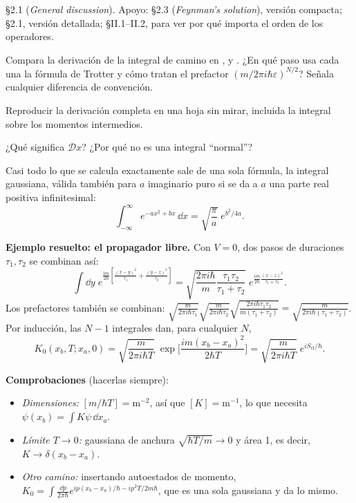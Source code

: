  \S2.1 (\textit{General discussion}). Apoyo:  \S2.3 (\textit{Feynman's solution}), versión compacta;  \S2.1, versión detallada;  \S II.1--II.2, para ver por qué importa el orden de los operadores.

\begin{prompt}
Compara la derivación de la integral de camino en ,  y . ¿En qué paso usa cada una la fórmula de Trotter y cómo tratan el prefactor $(m/2\pi i\hbar\varepsilon)^{N/2}$? Señala cualquier diferencia de convención.
\end{prompt}

Reproducir la derivación completa en una hoja sin mirar, incluida la integral sobre los momentos intermedios.

¿Qué significa $\mathcal Dx$? ¿Por qué no es una integral ``normal''?


Casi todo lo que se calcula exactamente sale de una sola fórmula, la integral gaussiana, válida también para $a$ imaginario puro si se da a $a$ una parte real positiva infinitesimal:
\[
\int_{-\infty}^{\infty}e^{-ax^2+bx}\,\dd x=\sqrt{\frac{\pi}{a}}\;e^{b^2/4a}.
\]

\textbf{Ejemplo resuelto: el propagador libre.} Con $V=0$, dos pasos de duraciones $\tau_1,\tau_2$ se combinan así:
\[
\int\dd y\;e^{\frac{im}{2\hbar}\left[\frac{(x-y)^2}{\tau_1}+\frac{(y-z)^2}{\tau_2}\right]}
=\sqrt{\frac{2\pi i\hbar}{m}\frac{\tau_1\tau_2}{\tau_1+\tau_2}}\;e^{\frac{im}{2\hbar}\frac{(x-z)^2}{\tau_1+\tau_2}} .
\]
Los prefactores también se combinan: $\sqrt{\tfrac{m}{2\pi i\hbar\tau_1}}\sqrt{\tfrac{m}{2\pi i\hbar\tau_2}}\sqrt{\tfrac{2\pi i\hbar\tau_1\tau_2}{m(\tau_1+\tau_2)}}=\sqrt{\tfrac{m}{2\pi i\hbar(\tau_1+\tau_2)}}$. Por inducción, las $N-1$ integrales dan, para cualquier $N$,
\[
\boxed{K_0(x_b,T;x_a,0)=\sqrt{\frac{m}{2\pi i\hbar T}}\;\exp\!\Big[\frac{im(x_b-x_a)^2}{2\hbar T}\Big]=\sqrt{\frac{m}{2\pi i\hbar T}}\;e^{iS_{\text{cl}}/\hbar}.}
\]

\textbf{Comprobaciones} (hacerlas siempre):
\begin{itemize}
    \item \emph{Dimensiones:} $[m/\hbar T]=\mathrm{m}^{-2}$, así que $[K]=\mathrm{m}^{-1}$, lo que necesita $\psi(x_b)=\int K\psi\,\dd x_a$.
    \item \emph{Límite $T\to0$:} gaussiana de anchura $\sqrt{\hbar T/m}\to0$ y área 1, es decir, $K\to\delta(x_b-x_a)$.
    \item \emph{Otro camino:} insertando autoestados de momento, $K_0=\int\frac{\dd p}{2\pi\hbar}e^{ip(x_b-x_a)/\hbar-ip^2T/2m\hbar}$, que es una sola gaussiana y da lo mismo.
\end{itemize}

